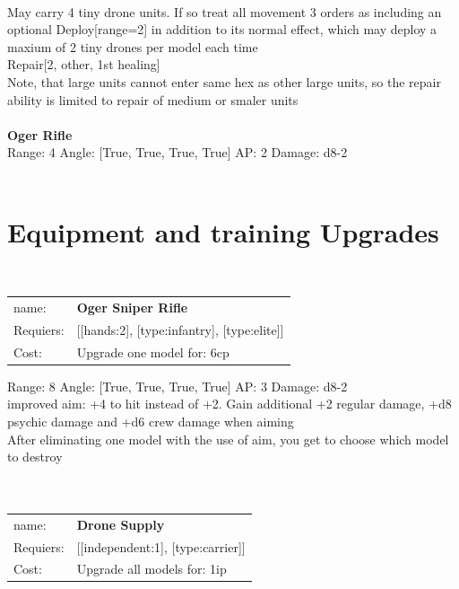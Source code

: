 \ \\
May carry 4 tiny drone units. If so treat all movement 3 orders as including an optional Deploy[range=2] in addition to its normal effect, which may deploy a maxium of 2 tiny drones per model each time\\ 
Repair[2, other, 1st healing]\\ 
Note, that large units cannot enter same hex as other large units, so the repair ability is limited to repair of medium or smaler units\\ 

\ \\
{\bf Oger Rifle } \\



Range: 4  Angle: [True, True, True, True] AP: 2 Damage: d8-2 \\




 
\ \\

\section{Equipment and training Upgrades}\ \\
\begin{tabular}{ll}
name: & {\bf Oger Sniper Rifle } \\
Requiers: & [[hands:2], [type:infantry], [type:elite]] \\
Cost: & Upgrade one model for: 6cp \\
\end{tabular}



Range: 8  Angle: [True, True, True, True] AP: 3 Damage: d8-2 \\
improved aim: +4 to hit instead of +2. Gain additional +2 regular damage, +d8 psychic damage and +d6 crew damage when aiming\\ 
After eliminating one model with the use of aim, you get to choose which model to destroy\\ 








\ \\
\ \\
\begin{tabular}{ll}
name: & {\bf Drone Supply } \\
Requiers: & [[independent:1], [type:carrier]] \\
Cost: & Upgrade all models for: 1ip \\
\end{tabular}


